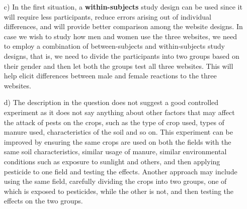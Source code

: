 \documentclass[a4paper]{article}
\begin{document}
\begin{enumerate}
\item[c)] In the first situation, a \textbf{within-subjects} study design can be used since it will require less participants, reduce errors arising out of individual differences, and will provide better comparison among the website designs.
In case we wish to study how men and women use the three websites, we need to employ a combination of between-subjects and within-subjects study designs, that is, we need to divide the participants into two groups based on their gender and then let both the groups test all three websites. This will help elicit differences between male and female reactions to the three websites.
\item[d)] The description in the question does not suggest a good controlled experiment as it does not say anything about other factors that may affect the attack of pests on the crops, such as the type of crop used, types of manure used, characteristics of the soil and so on.\linebreak\linebreak
This experiment can be improved by ensuring the same crops are used on both the fields with the same soil characteristics, similar usage of manure, similar environmental conditions such as exposure to sunlight and others, and then applying pesticide to one field and testing the effects. Another approach may include using the same field, carefully dividing the crops into two groups, one of which is exposed to pesticides, while the other is not, and then testing the effects on the two groups.
\end{enumerate}
\end{document}
